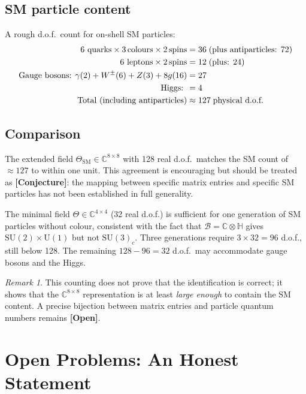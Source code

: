 \documentclass[12pt,a4paper]{article}
\theoremstyle{remark}
\newtheorem{remark}[theorem]{Remark}
\newcommand{\B}{\mathcal{B}}
\newcommand{\C}{\mathbb{C}}
\newcommand{\H}{\mathbb{H}}
\newcommand{\conjecture}{\textbf{[Conjecture]}}
\newcommand{\openq}{\textbf{[Open]}}
\begin{document}
\subsection{SM particle content}

A rough d.o.f.\ count for on-shell SM particles:
\begin{align}
  \text{6 quarks} \times 3\,\text{colours} \times 2\,\text{spins}
    &= 36\;\text{(plus antiparticles: 72)} \notag \\
  \text{6 leptons} \times 2\,\text{spins}
    &= 12\;\text{(plus: 24)} \notag \\
  \text{Gauge bosons: } \gamma(2)+W^\pm(6)+Z(3)+8g(16)
    &= 27 \notag \\
  \text{Higgs: }
    &= 4 \notag \\
  \text{Total (including antiparticles)}
    &\approx 127\;\text{physical d.o.f.}
  \label{eq:SMcount}
\end{align}

\subsection{Comparison}

The extended field $\Theta_{\mathrm{SM}}\in\C^{8\times 8}$ with 128 real
d.o.f.\ matches the SM count of $\approx 127$ to within one unit.  This
agreement is encouraging but should be treated as \conjecture: the mapping
between specific matrix entries and specific SM particles has not been
established in full generality.

The minimal field $\Theta\in\C^{4\times 4}$ (32 real d.o.f.) is sufficient
for one generation of SM particles without colour, consistent with the fact
that $\B = \C\otimes\H$ gives $\mathrm{SU}(2)\times\mathrm{U}(1)$ but not
$\mathrm{SU}(3)_c$.  Three generations require $3\times 32 = 96$ d.o.f.,
still below 128.  The remaining $128-96 = 32$ d.o.f.\ may accommodate gauge
bosons and the Higgs.

\begin{remark}
This counting does not prove that the identification is correct; it shows
that the $\C^{8\times 8}$ representation is at least \emph{large enough} to
contain the SM content.  A precise bijection between matrix entries and
particle quantum numbers remains \openq.
\end{remark}

\section{Open Problems: An Honest Statement}
\label{sec:open}
\end{document}
